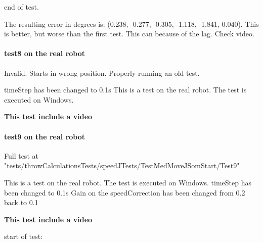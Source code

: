 end of test.\newline 

The resulting error in degrees is: (0.238, -0.277, -0.305, -1.118, -1.841, 0.040). This is better, but worse than the first test. This can because of the lag. Check video.

\paragraph{test8 on the real robot} 
Invalid. Starts in wrong position. Properly running an old test.

timeStep has been changed to 0.1s\newline
This is a test on the real robot. The test is executed on Windows.\newline

\textbf{This test include a video}\newline

\paragraph{test9 on the real robot}
Full test at "tests/throwCalculationsTests/speedJTests/TestMedMoveJSomStart/Test9"

This is a test on the real robot. The test is executed on Windows.\newline
timeStep has been changed to 0.1s\newline
Gain on the speedCorrection has been changed from 0.2 back to 0.1

\textbf{This test include a video}

start of test: \newline 

